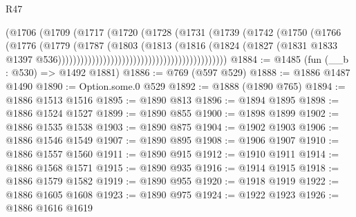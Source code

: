 \begin{lexlean}{R47}
\begin{coremodule}
                                                        (@1706
                                                          (@1709
                                                            (@1717
                                                              (@1720
                                                                (@1728
                                                                  (@1731
                                                                    (@1739
                                                                      (@1742
                                                                        (@1750
                                                                          (@1766
                                                                            (@1776
                                                                              (@1779
                                                                                (@1787
                                                                                  (@1803
                                                                                    (@1813
                                                                                      (@1816
                                                                                        (@1824
                                                                                          (@1827
                                                                                            (@1831
                                                                                              @1833
                                                                                              @1397
                                                                                              @536)))))))))))))))))))))))))))))))))))))))))))))
@1884 := @1485 (fun (__b : @530) => @1492 @1881)
@1886 := @769 (@597 @529)
@1888 := @1886 @1487 @1490
@1890 := Option.some.{0} @529
@1892 := @1888 (@1890 @765)
@1894 := @1886 @1513 @1516
@1895 := @1890 @813
@1896 := @1894 @1895
@1898 := @1886 @1524 @1527
@1899 := @1890 @855
@1900 := @1898 @1899
@1902 := @1886 @1535 @1538
@1903 := @1890 @875
@1904 := @1902 @1903
@1906 := @1886 @1546 @1549
@1907 := @1890 @895
@1908 := @1906 @1907
@1910 := @1886 @1557 @1560
@1911 := @1890 @915
@1912 := @1910 @1911
@1914 := @1886 @1568 @1571
@1915 := @1890 @935
@1916 := @1914 @1915
@1918 := @1886 @1579 @1582
@1919 := @1890 @955
@1920 := @1918 @1919
@1922 := @1886 @1605 @1608
@1923 := @1890 @975
@1924 := @1922 @1923
@1926 := @1886 @1616 @1619

\end{coremodule}
\end{lexlean}
